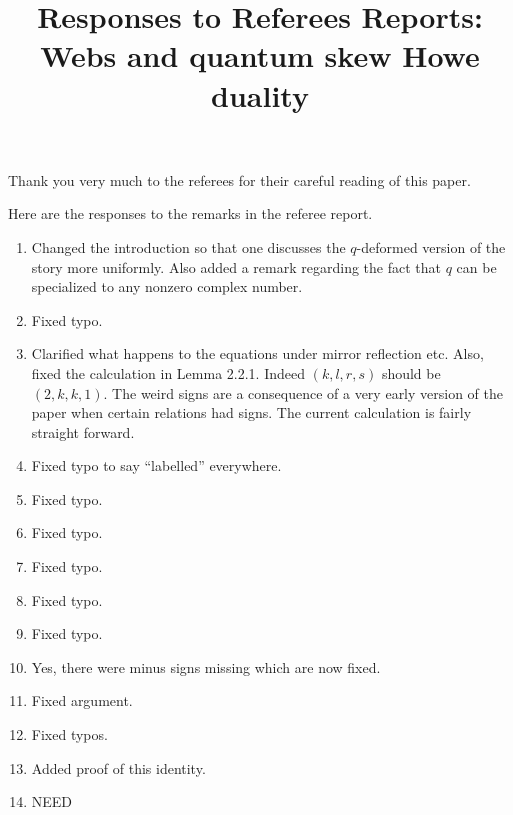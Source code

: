 \documentclass{amsart}
\title{Responses to Referees Reports: Webs and quantum skew Howe duality}
\begin{document}
\maketitle 



Thank you very much to the referees for their careful reading of this paper.



Here are the responses to the remarks in the referee report. 



\begin{enumerate}

\item Changed the introduction so that one discusses the $q$-deformed version of the story more uniformly. Also added a remark regarding the fact that $q$ can be specialized to any nonzero complex number. 

\item Fixed typo.

\item Clarified what happens to the equations under mirror reflection etc. Also, fixed the calculation in Lemma 2.2.1. Indeed $(k,l,r,s)$ should be $(2,k,k,1)$. The weird signs are a consequence of a very early version of the paper when certain relations had signs. The current calculation is fairly straight forward. 

\item Fixed typo to say ``labelled'' everywhere. 

\item Fixed typo.

\item Fixed typo.

\item Fixed typo.

\item Fixed typo.

\item Fixed typo.

\item Yes, there were minus signs missing which are now fixed. 

\item Fixed argument. 

\item Fixed typos. 

\item Added proof of this identity.

\item NEED


\end{enumerate}
\end{document}

